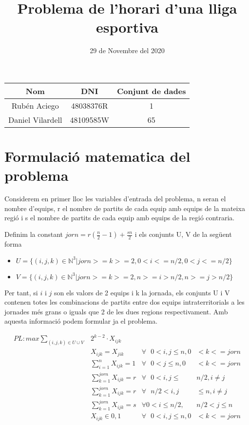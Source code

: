 \documentclass[12pt, a4papre]{article}
\author{}
\title{Problema de l'horari d'una lliga esportiva}
\date{29 de Novembre del 2020}
\begin{document}
	\maketitle
	\begin{center}
		\begin{tabular}{ |c | c  c |}
			\hline
			\textbf{Nom} 		& \textbf{DNI}		& \textbf{Conjunt de dades} \\ \hline
			Rubén Aciego 		&48038376R 		 		& 1  			\\ 
			Daniel Vilardell 		&48109585W 		& 65\\
			\hline
		\end{tabular}
	\end{center}
	\tableofcontents
	
	\newpage
	\section{Formulació matematica del problema}
	
	Considerem en primer lloc les variables d'entrada del problema, n seran el nombre d'equips, r el nombre de partits de cada equip amb equips de la mateixa regió i s el nombre de partits de cada equip amb  equips de la regió contraria.
	
	Definim la constant $jorn = r(\frac{n}{2} - 1)+\frac{sn}{2}$	
	i els conjunts U, V de la següent forma \\
	
	\begin{itemize}
		\item$U = \{(i, j, k) \in \mathbb{N}^3 | jorn >= k >= 2, 0 < i <= n/2, 0 < j <= n/2\}$ 
		\item$V = \{(i, j, k) \in \mathbb{N}^3 | jorn >= k >= 2, n >= i > n/2, n >= j > n/2\}$
	\end{itemize}
	
	Per tant, si $i$ i $j$ son els valors de 2 equips i k la jornada, els conjunts U i V contenen totes les combinacions de partits entre dos equips intraterritorials a les jornades més grans o iguals que 2 de les dues regions respectivament. Amb aquesta informació podem formular ja el problema.
	
	\begin{align*}
	PL \colon	 max \sum_{(i, j, k) \in U\cup V}& 2^{k - 2}\cdot X_{ijk} \\	
			& X_{ijk} = X_{jik} 			& \forall \text{ }0 < i, j \leqslant n, 0 &< k <= jorn\\
			& \sum_{i=1}^n X_{ijk} = 1 	& \forall \text{ }0 < j \leqslant n, 0 &< k  <= jorn\\
			& \sum_{k=1}^{jorn} X_{ijk} = r	& \forall \text{ }0 < i, j \leqslant &n/2, i \neq j\\
			& \sum_{k=1}^{jorn} X_{ijk} = r 	& \forall \text{ }n/2 < i, j& \leqslant n, i \neq j\\
			& \sum_{k=1}^{jorn} X_{ijk} = s	& \forall 0 < i \leqslant n/2,& n/2 < j \leqslant n\\
			& X_{ijk} \in {0, 1} 			& \forall \text{ }0 < i, j \leqslant n, 0 &< k <= jorn\\
	\end{align*}
	
\end{document}
